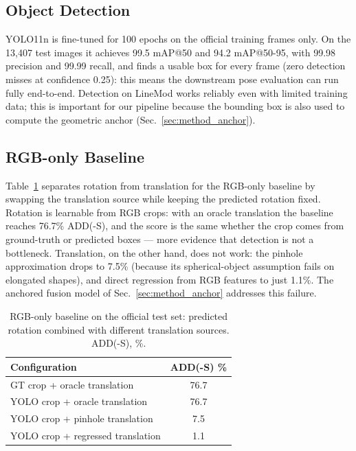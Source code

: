 \subsection{Object Detection}
\label{sec:exp_detection}

YOLO11n is fine-tuned for 100 epochs on the official training frames only. On the 13{,}407 test images it achieves 99.5 mAP@50 and 94.2 mAP@50-95, with 99.98 precision and 99.99 recall, and finds a usable box for every frame (zero detection misses at confidence 0.25): this means the downstream pose evaluation can run fully end-to-end. Detection on LineMod works reliably even with limited training data; this is important for our pipeline because the bounding box is also used to compute the geometric anchor (Sec.~\ref{sec:method_anchor}).

\subsection{RGB-only Baseline}
\label{sec:exp_rgb_baseline}

Table~\ref{tab:phase3} separates rotation from translation for the RGB-only baseline by swapping the translation source while keeping the predicted rotation fixed. Rotation is learnable from RGB crops: with an oracle translation the baseline reaches 76.7\% ADD(-S), and the score is the same whether the crop comes from ground-truth or predicted boxes --- more evidence that detection is not a bottleneck. Translation, on the other hand, does not work: the pinhole approximation drops to 7.5\% (because its spherical-object assumption fails on elongated shapes), and direct regression from RGB features to just 1.1\%. The anchored fusion model of Sec.~\ref{sec:method_anchor} addresses this failure.

\begin{table}[t]
    \centering
    \caption{RGB-only baseline on the official test set: predicted rotation combined with different translation sources. ADD(-S), \%.}
    \label{tab:phase3}
    \small
    \begin{tabular}{@{}lc@{}}
        \toprule
        \textbf{Configuration} & \textbf{ADD(-S) \%} \\
        \midrule
        GT crop + oracle translation & 76.7 \\
        YOLO crop + oracle translation & 76.7 \\
        YOLO crop + pinhole translation & 7.5 \\
        YOLO crop + regressed translation & 1.1 \\
        \bottomrule
    \end{tabular}
\end{table}

